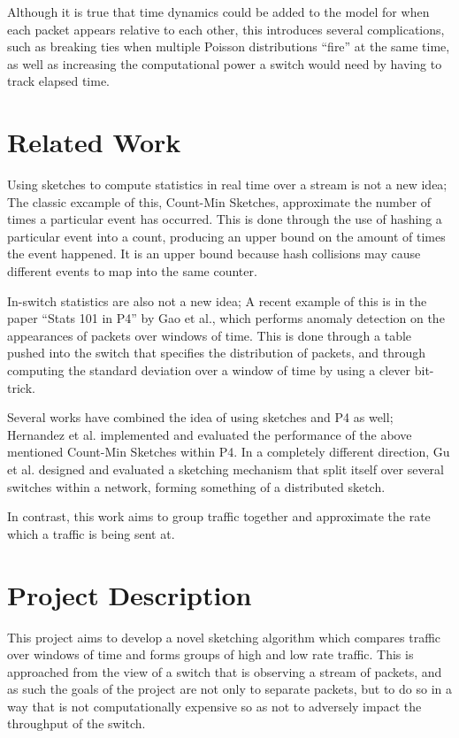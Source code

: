 \documentclass[conference]{IEEEtran}
\begin{document}
Although it is true that time dynamics could be added to the model for when each packet appears relative to each other, this introduces several complications, such as breaking ties when multiple Poisson distributions ``fire'' at the same time, as well as increasing the computational power a switch would need by having to track elapsed time.

\section{Related Work}
Using sketches to compute statistics in real time over a stream is not a new idea;  The classic excample of this, Count-Min Sketches\cite{cms}, approximate the number of times a particular event has occurred.  This is done through the use of hashing a particular event into a count, producing an upper bound on the amount of times the event happened.  It is an upper bound because hash collisions may cause different events to map into the same counter.

In-switch statistics are also not a new idea;  A recent example of this is in the paper ``Stats 101 in P4'' by Gao et al.\cite{stats101}, which performs anomaly detection on the appearances of packets over windows of time.  This is done through a table pushed into the switch that specifies the distribution of packets, and through computing the standard deviation over a window of time by using a clever bit-trick.

Several works have combined the idea of using sketches and P4 as well; Hernandez et al.\cite{count-min} implemented and evaluated the performance of the above mentioned Count-Min Sketches within P4.  In a completely different direction, Gu et al.\cite{per-flow} designed and evaluated a sketching mechanism that split itself over several switches within a network, forming something of a distributed sketch.

In contrast, this work aims to group traffic together and approximate the rate which a traffic is being sent at.

\section{Project Description}
This project aims to develop a novel sketching algorithm which compares traffic over windows of time and forms groups of high and low rate traffic.  This is approached from the view of a switch that is observing a stream of packets, and as such the goals of the project are not only to separate packets, but to do so in a way that is not computationally expensive so as not to adversely impact the throughput of the switch.
\end{document}
